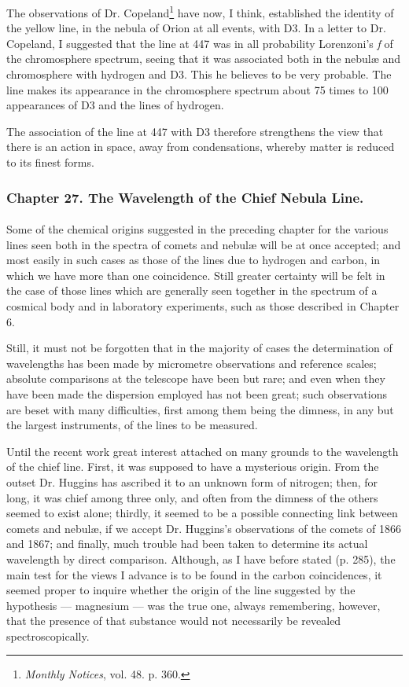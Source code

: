 \documentclass[a4paper, 12pt, oneside, polutonikogreek, english]{article}
\begin{document}
The observations of Dr. Copeland\footnote{\emph{Monthly Notices}, vol. 48. p. 360.} have now, I think, established the identity of the yellow line, in the nebula of Orion at all events, with D3. In a letter to Dr. Copeland, I suggested that the line at 447 was in all probability Lorenzoni's \emph{f} of the chromosphere spectrum, seeing that it was associated both in the nebulæ and chromosphere with hydrogen and D3. This he believes to be very probable. The line makes its appearance in the chromosphere spectrum about 75 times to 100 appearances of D3 and the lines of hydrogen.

The association of the line at 447 with D3 therefore strengthens the view that there is an action in space, away from condensations, whereby matter is reduced to its finest forms.
\clearpage
\subsubsection{Chapter 27. The Wavelength of the Chief Nebula Line.}
\paragraph{}
Some of the chemical origins suggested in the preceding chapter for the various lines seen both in the spectra of comets and nebulæ will be at once accepted; and most easily in such cases as those of the lines due to hydrogen and carbon, in which we have more than one coincidence. Still greater certainty will be felt in the case of those lines which are generally seen together in the spectrum of a cosmical body and in laboratory experiments, such as those described in Chapter 6.

Still, it must not be forgotten that in the majority of cases the determination of wavelengths has been made by micrometre observations and reference scales; absolute comparisons at the telescope have been but rare; and even when they have been made the dispersion employed has not been great; such observations are beset with many difficulties, first among them being the dimness, in any but the largest instruments, of the lines to be measured.

Until the recent work great interest attached on many grounds to the wavelength of the chief line. First, it was supposed to have a mysterious origin. From the outset Dr. Huggins has ascribed it to an unknown form of nitrogen; then, for long, it was chief among three only, and often from the dimness of the others seemed to exist alone; thirdly, it seemed to be a possible connecting link between comets and nebulæ, if we accept Dr. Huggins's observations of the comets of 1866 and 1867; and finally, much trouble had been taken to determine its actual wavelength by direct comparison. Although, as I have before stated (p. 285), the main test for the views I advance is to be found in the carbon coincidences, it seemed proper to inquire whether the origin of the line suggested by the hypothesis --- magnesium --- was the true one, always remembering, however, that the presence of that substance would not necessarily be revealed spectroscopically.
\end{document}

